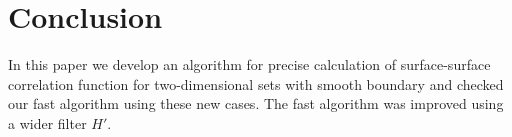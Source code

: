 \documentclass[reprint,amsmath,amssymb,aps,pre,showkeys,showpacs]{revtex4-1}
\begin{document}
\section{Conclusion}
In this paper we develop an algorithm for precise calculation of surface-surface
correlation function for two-dimensional sets with smooth boundary and checked
our fast algorithm using these new cases. The fast algorithm was improved using
a wider filter $H'$.


\end{document}
